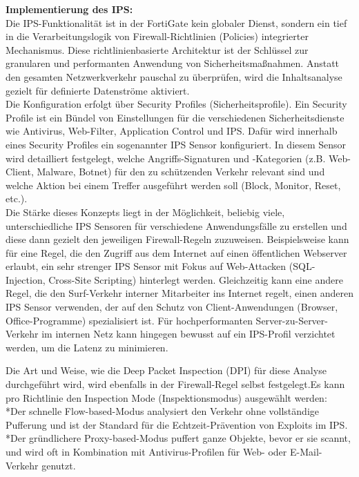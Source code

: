 \textbf{Implementierung des IPS:}\\
Die IPS-Funktionalität ist in der FortiGate kein globaler Dienst, sondern ein tief in die Verarbeitungslogik von Firewall-Richtlinien (Policies) integrierter Mechanismus. Diese richtlinienbasierte Architektur ist der Schlüssel zur granularen und performanten Anwendung von Sicherheitsmaßnahmen. Anstatt den gesamten Netzwerkverkehr pauschal zu überprüfen, wird die Inhaltsanalyse gezielt für definierte Datenströme aktiviert.\\

Die Konfiguration erfolgt über Security Profiles (Sicherheitsprofile). Ein Security Profile ist ein Bündel von Einstellungen für die verschiedenen Sicherheitsdienste wie Antivirus, Web-Filter, Application Control und IPS. Dafür wird innerhalb eines Security Profiles ein sogenannter IPS Sensor konfiguriert. In diesem Sensor wird detailliert festgelegt, welche Angriffs-Signaturen und -Kategorien (z.B. Web-Client, Malware, Botnet) für den zu schützenden Verkehr relevant sind und welche Aktion bei einem Treffer ausgeführt werden soll (Block, Monitor, Reset, etc.).\\

Die Stärke dieses Konzepts liegt in der Möglichkeit, beliebig viele, unterschiedliche IPS Sensoren für verschiedene Anwendungsfälle zu erstellen und diese dann gezielt den jeweiligen Firewall-Regeln zuzuweisen. Beispielsweise kann für eine Regel, die den Zugriff aus dem Internet auf einen öffentlichen Webserver erlaubt, ein sehr strenger IPS Sensor mit Fokus auf Web-Attacken (SQL-Injection, Cross-Site Scripting) hinterlegt werden. Gleichzeitig kann eine andere Regel, die den Surf-Verkehr interner Mitarbeiter ins Internet regelt, einen anderen IPS Sensor verwenden, der auf den Schutz von Client-Anwendungen (Browser, Office-Programme) spezialisiert ist. Für hochperformanten Server-zu-Server-Verkehr im internen Netz kann hingegen bewusst auf ein IPS-Profil verzichtet werden, um die Latenz zu minimieren.

Die Art und Weise, wie die Deep Packet Inspection (DPI) für diese Analyse durchgeführt wird, wird ebenfalls in der Firewall-Regel selbst festgelegt.Es kann pro Richtlinie den Inspection Mode (Inspektionsmodus) ausgewählt werden:\\

*Der schnelle Flow-based-Modus analysiert den Verkehr ohne vollständige Pufferung und ist der Standard für die Echtzeit-Prävention von Exploits im IPS.\\
*Der gründlichere Proxy-based-Modus puffert ganze Objekte, bevor er sie scannt, und wird oft in Kombination mit Antivirus-Profilen für Web- oder E-Mail-Verkehr genutzt.\\

